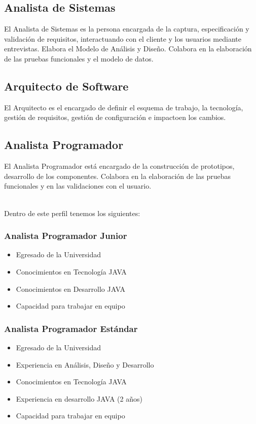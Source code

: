 	\subsection{Analista de Sistemas}
		El Analista de Sistemas es la persona encargada de la captura, especificación y
		validación de requisitos, interactuando con el cliente y los usuarios mediante
		entrevistas. Elabora el Modelo de Análisis y Diseño. Colabora en la elaboración
		de las pruebas funcionales y el modelo de datos.
		
	\subsection{Arquitecto de Software}
		El Arquitecto es el encargado de definir el esquema de trabajo, la
		tecnología, gestión de requisitos, gestión de configuración e impactoen los
		cambios.
		
	\subsection{Analista Programador}
		El Analista Programador está encargado de la construcción de prototipos,
		desarrollo de los componentes. Colabora en la elaboración de las pruebas
		funcionales y en las validaciones con el usuario.\\\
		
		Dentro de este perfil tenemos los siguientes:
		
		\subsubsection{Analista Programador Junior}
			\begin{itemize}
				\item Egresado de la Universidad
				\item Conocimientos en Tecnología JAVA
				\item Conocimientos en Desarrollo JAVA
				\item Capacidad para trabajar en equipo
			\end{itemize}
			
		\subsubsection{Analista Programador Estándar}
			\begin{itemize}
				\item Egresado de la Universidad
				\item Experiencia en Análisis, Diseño y Desarrollo
				\item Conocimientos en Tecnología JAVA
				\item Experiencia en desarrollo JAVA (2 años)
				\item Capacidad para trabajar en equipo
			\end{itemize}
			
